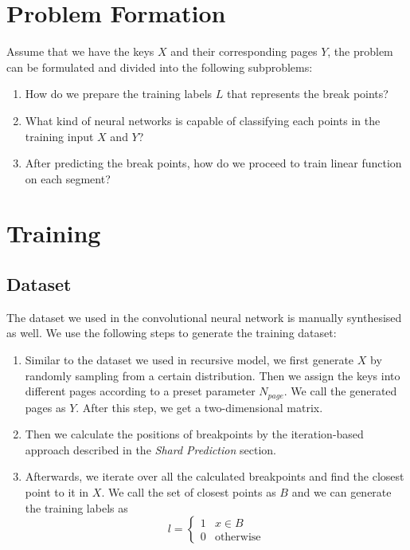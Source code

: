 \section{Problem Formation}

Assume that we have the keys $X$ and their corresponding pages $Y$, the problem can be formulated and divided into the following subproblems:

\begin{enumerate}
	\item How do we prepare the training labels $L$ that represents the break points?
	\item What kind of neural networks is capable of classifying each points in the training input $X$ and $Y$?
	\item After predicting the break points, how do we proceed to train linear function on each segment? 
\end{enumerate}

\section{Training}

\subsection{Dataset}

The dataset we used in the convolutional neural network is manually synthesised as well. We use the following steps to generate the training dataset:

\begin{enumerate}
	\item Similar to the dataset we used in recursive model, we first generate $X$ by randomly sampling from a certain distribution. Then we assign the keys into different pages according to a preset parameter $N_{page}$. We call the generated pages as $Y$. After this step, we get a two-dimensional matrix.
	\item Then we calculate the positions of breakpoints by the iteration-based approach described in the \textit{Shard Prediction} section.
	\item Afterwards, we iterate over all the calculated breakpoints and find the closest point to it in $X$. We call the set of closest points as $B$ and we can generate the training labels as
	\begin{equation}
		l=\begin{cases}
			1 & x\in B \\
			0 & \text{otherwise} 
		\end{cases}
	\end{equation}
\end{enumerate}

